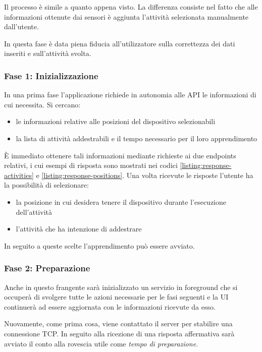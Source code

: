 \vspace{5mm} %

Il processo è simile a quanto appena visto. La differenza consiste nel fatto che alle informazioni ottenute dai sensori è 
aggiunta l'attività selezionata manualmente dall'utente.

\vspace{5mm} %

In questa fase è data piena fiducia all'utilizzatore sulla correttezza dei dati inseriti e sull'attività svolta.

\subsubsection{Fase 1: Inizializzazione}
In una prima fase l'applicazione richiede in autonomia alle API le informazioni di cui necessita. Si cercano:
\begin{itemize}
    \item le informazioni relative alle posizioni del dispositivo selezionabili
    \item la lista di attività addestrabili e il tempo necessario per il loro apprendimento
\end{itemize}
È immediato ottenere tali informazioni mediante richieste ai due endpoints relativi, i cui esempi di risposta sono mostrati nei codici 
\ref{listing:response-activities} e \ref{listing:response-positions}.
Una volta ricevute le risposte l'utente ha la possibilità di selezionare: 
\begin{itemize}
    \item la posizione in cui desidera tenere il dispositivo durante l'esecuzione dell'attività
    \item l'attività che ha intenzione di addestrare
\end{itemize}
In seguito a queste scelte l'apprendimento può essere avviato.

\subsubsection{Fase 2: Preparazione}
Anche in questo frangente sarà inizializzato un servizio in foreground \cite{services} che si occuperà di svolgere 
tutte le azioni necessarie per le fasi seguenti e la UI continuerà ad essere aggiornata con le informazioni ricevute da esso.

Nuovamente, come prima cosa, viene contattato il server per stabilire una connessione TCP. 
In seguito alla ricezione di una risposta affermativa sarà avviato il conto alla rovescia utile come \textit{tempo di preparazione}.


